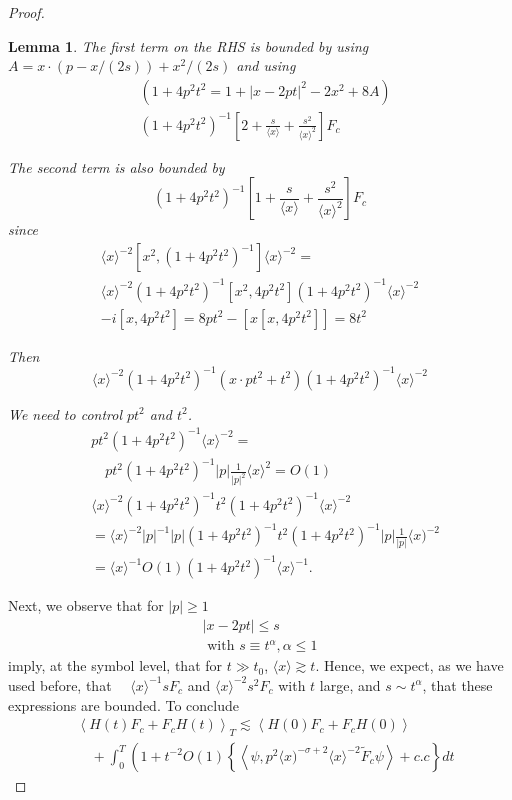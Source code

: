 \documentclass[11pt]{article}
\newtheorem{lemma}[theorem]{Lemma}
\begin{document}
\begin{proof}
\begin{lemma}
The first term on the RHS is bounded by using $A=x\cdot (p-x/(2s))+x^2/(2s)$ and using 
$$
\begin{aligned}
& \left( 1+4 p^{2} t^{2}=1+|x-2 p t|^{2}-2 x^{2}+8 A\right) \\
& \left(1+4 p^{2} t^{2}\right)^{-1}\left[2+\frac{s}{\langle x\rangle}+\frac{s^{2}}{\langle x\rangle^{2}}\right] F_{c}
\end{aligned}
$$

The second term is also bounded by
$$
\left(1+4 p^{2} t^{2}\right)^{-1}\left[1+\frac{s}{\langle x\rangle}+\frac{s^{2}}{\langle x\rangle^{2}}\right] F_{c}
$$
since
$$
\begin{gathered}
\langle x\rangle^{-2}\left[x^{2},\left(1+4 p^{2} t^{2}\right)^{-1}\right]\langle x\rangle^{-2}= \\
\langle x\rangle^{-2}\left(1+4 p^{2} t^{2}\right)^{-1}\left[x^{2}, 4 p^{2} t^{2}\right]\left(1+4 p^{2} t^{2}\right)^{-1}\langle x\rangle^{-2} \\
-i\left[x, 4 p^{2} t^{2}\right]=8 p t^{2}-\left[x\left[x, 4 p^{2} t^{2}\right]\right]=8 t^{2}
\end{gathered}
$$

Then
$$
\langle x\rangle^{-2}\left(1+4 p^{2} t^{2}\right)^{-1}\left(x \cdot p t^{2}+t^{2}\right)\left(1+4 p^{2} t^{2}\right)^{-1}\langle x\rangle^{-2}
$$

We need to control $p t^{2}$ and $t^{2}$.
$$
\begin{aligned}
& p t^{2}\left(1+4 p^{2} t^{2}\right)^{-1}\langle x\rangle^{-2}= \\
& \quad p t^{2}\left(1+4 p^{2} t^{2}\right)^{-1}|p| \frac{1}{|p|^{2}}\langle x\rangle^{2}=O(1) \\
& \langle x\rangle^{-2}\left(1+4 p^{2} t^{2}\right)^{-1}t^{2}\left(1+4 p^{2} t^{2}\right)^{-1}\langle x\rangle^{-2} \\
& =\langle x\rangle^{-2}|p|^{-1}|p|\left(1+4 p^{2} t^{2}\right)^{-1} t^{2}\left(1+4 p^{2} t^{2}\right)^{-1}|p| \frac{1}{|p|}\langle x)^{-2} \\
& =\langle x\rangle^{-1}O(1)\left(1+4 p^{2} t^{2}\right)^{-1}\langle x\rangle^{-1} .
\end{aligned}
$$
\end{lemma}
Next, we observe that for $|p| \geqslant 1$
$$
\begin{gathered}
|x-2 p t| \leq s \\
\text { with } s \equiv t^{\alpha}, \alpha \leq 1
\end{gathered}
$$
imply, at the symbol level, that for $t \gg t_{0}$,
$\langle x\rangle \gtrsim t$.
Hence, we expect, as we have used before, that $\quad\langle x\rangle^{-1} s F_{c}$ and $\langle x\rangle^{-2} s^{2} F_{c}$
with $t$ large, and $s \sim t^{\alpha}$, that these expressions are bounded.
To conclude
$$
\begin{aligned}
& \left\langle H(t) F_{c}+F_{c} H(t)\right\rangle_{T} \lesssim\left\langle H(0) F_{c}+F_{c} H(0)\right\rangle \\
& \quad+\int_{0}^{T}\left(1+t^{-2} O(1)\left\{\left\langle \psi, p^{2}\langle x)^{-\sigma+2}\langle x\rangle^{-2} \tilde{F}_{c} \psi\right\rangle+c . c\right\} d t\right.
\end{aligned}
$$


\end{proof}
\end{document}
